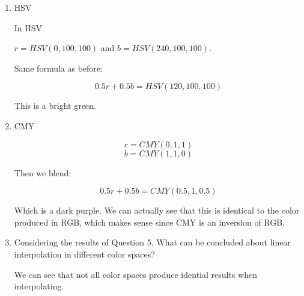 \documentclass{article}
\begin{document}
\begin{enumerate}
\begin{enumerate}
\begin{mdframed}
                        This is a slightly dark purple.
                    \end{mdframed}

                \item HSV

                    \begin{mdframed}
                        In HSV

                        $r = HSV(0, 100, 100)$
                        and $b = HSV(240, 100, 100)$.

                        Same formula as before:

                        \begin{displaymath}
                            0.5r + 0.5b = 
                            HSV(120, 100, 100)
                        \end{displaymath}

                        This is a bright green.
                    \end{mdframed}
                \item CMY
                    \begin{mdframed}
                       \begin{displaymath}
                           r = CMY(0, 1, 1)
                       \end{displaymath} 
                       \begin{displaymath}
                           b = CMY(1, 1, 0)
                       \end{displaymath}

                       Then we blend:

                       \begin{displaymath}
                           0.5r + 0.5b =
                           CMY(0.5, 1, 0.5)
                       \end{displaymath}

                       Which is a dark purple. We can actually see that
                       this is identical to the color produced in RGB,
                       which makes sense since CMY is an inversion of
                       RGB.
                    \end{mdframed}
                \item Considering the results of Question 5. What can be concluded about linear interpolation
                    in different color spaces?
                    \begin{mdframed}
                        We can see that not all color spaces
                        produce idential results when interpolating.


\end{mdframed}
\end{enumerate}
\end{enumerate}
\end{document}
